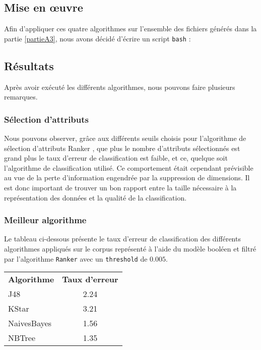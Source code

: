 \subsection{Mise en œuvre}
Afin d'appliquer ces quatre algorithmes sur l'ensemble des fichiers générés dans la partie \vref{partieA3}, nous avons décidé d'écrire un script \texttt{bash} :



\subsection{Résultats}

Après avoir exécuté les différents algorithmes, nous pouvons faire plusieurs remarques.

\subsubsection{Sélection d'attributs}
Nous pouvons observer, grâce aux différents seuils choisis pour l'algorithme de sélection d'attributs \og Ranker \fg{}, que plus le nombre d'attributs sélectionnés est grand plus le taux d'erreur de classification est faible, et ce, quelque soit l'algorithme de classification utilisé. Ce comportement était cependant prévisible au vue de la perte d'information engendrée par la suppression de dimensions. Il est donc important de trouver un bon rapport entre la taille nécessaire à la représentation des données et la qualité de la classification.  

\subsubsection{Meilleur algorithme}

Le tableau ci-dessous présente le taux d'erreur de classification des différents algorithmes appliqués sur le corpus représenté à l'aide du modèle booléen et filtré par l'algorithme \texttt{Ranker} avec un \texttt{threshold} de $0.005$.

\begin{tabular}{l c} 
\textbf{Algorithme} & \textbf{Taux d'erreur}\\
J48 & 2.24\\
KStar & 3.21\\
NaivesBayes & 1.56\\
NBTree & 1.35\\
\end{tabular}

